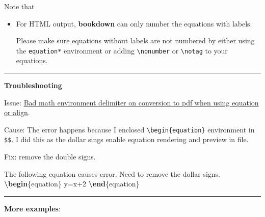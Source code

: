 \documentclass[
]{book}
\newenvironment{Shaded}{\begin{snugshade}}{\end{snugshade}}
\newcommand{\ExtensionTok}[1]{#1}
\newcommand{\KeywordTok}[1]{\textcolor[rgb]{0.13,0.29,0.53}{\textbf{#1}}}
\newcommand{\NormalTok}[1]{#1}
\newcommand{\SpecialStringTok}[1]{\textcolor[rgb]{0.31,0.60,0.02}{#1}}
\theoremstyle{definition}
\theoremstyle{definition}
\theoremstyle{definition}
\theoremstyle{definition}
\theoremstyle{remark}
\begin{document}
Note that

\begin{itemize}
\item
  For HTML output, \textbf{bookdown} can only number the equations with labels.

  Please make sure equations without labels are not numbered by either using the \texttt{equation*} environment or adding \texttt{\textbackslash{}nonumber} or \texttt{\textbackslash{}notag} to your equations.
\end{itemize}

\begin{center}\rule{0.5\linewidth}{0.5pt}\end{center}

\textbf{Troubleshooting}

Issue: \href{https://github.com/jupyter/nbconvert/issues/232}{Bad math environment delimiter on conversion to pdf when using equation or align}.

Cause: The error happens because I enclosed \texttt{\textbackslash{}begin\{equation\}} environment in \texttt{\$\$}. I did this as the dollar sings enable equation rendering and preview in file.

Fix: remove the double signs.

\begin{Shaded}
\begin{Highlighting}[]
\NormalTok{The following equation causes error. Need to remove the dollar signs.}
\SpecialStringTok{$$}
\KeywordTok{\textbackslash{}begin}\NormalTok{\{}\ExtensionTok{equation}\NormalTok{\}}
\SpecialStringTok{y=x+2}
\KeywordTok{\textbackslash{}end}\NormalTok{\{}\ExtensionTok{equation}\NormalTok{\}}
\SpecialStringTok{$$}
\end{Highlighting}
\end{Shaded}

\begin{center}\rule{0.5\linewidth}{0.5pt}\end{center}

\textbf{More examples}:
\end{document}
